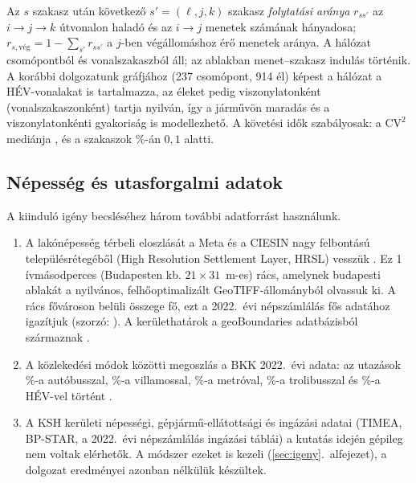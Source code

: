 \documentclass[12pt,a4paper]{article}
\theoremstyle{definition}
\theoremstyle{remark}
\begin{document}
Az $s$ szakasz után következő $s'=(\ell,j,k)$ szakasz \emph{folytatási aránya}
$r_{ss'}$ az $i\to j\to k$ útvonalon haladó és az $i\to j$ menetek számának
hányadosa; $r_{s,\text{vég}}=1-\sum_{s'}r_{ss'}$ a $j$-ben végállomáshoz
érő menetek aránya. A hálózat \NHUBS{} csomópontból és \NSEGS{}
vonalszakaszból áll; az ablakban \NTRIPSEG{} menet--szakasz indulás történik.
A korábbi dolgozatunk gráfjához (237 csomópont, 914 él) képest a
hálózat a HÉV-vonalakat is tartalmazza, az éleket pedig viszonylatonként
(vonalszakaszonként) tartja nyilván, így a járművön maradás és a
viszonylatonkénti gyakoriság is modellezhető. A követési idők szabályosak: a $\mathrm{CV}^2$ mediánja \MEDCVSQ, és a
szakaszok \SHARECVLOW{}\%-án $0{,}1$ alatti.

\subsection{Népesség és utasforgalmi adatok}
\label{sec:nepesseg}

A kiinduló igény becsléséhez három további adatforrást használunk.
\begin{enumerate}[label=(\roman*)]
  \item A lakónépesség térbeli eloszlását a Meta és a CIESIN nagy
    felbontású településrétegéből (High Resolution Settlement Layer, HRSL)
    vesszük \citep{tiecke2017}. Ez 1 ívmásodperces (Budapesten kb.
    $21\times31$~m-es) rács, amelynek budapesti ablakát a nyilvános,
    felhőoptimalizált GeoTIFF-állományból olvassuk ki. A rács fővároson belüli
    összege \POPHRSL{} fő, ezt a 2022.~évi népszámlálás \POPCITY{} fős
    adatához \citep{ksh2023} igazítjuk (szorzó: \POPSCALE). A kerülethatárok
    a geoBoundaries adatbázisból származnak \citep{runfola2020}.
  \item A közlekedési módok közötti megoszlás a BKK 2022.~évi adata: az
    utazások \TGTBUS\%-a autóbusszal, \TGTTRAM\%-a villamossal,
    \TGTMETRO\%-a metróval, \TGTTROLLEY\%-a trolibusszal és \TGTHEV\%-a
    HÉV-vel történt \citep{bkkmodal}.
  \item A KSH kerületi népességi, gépjármű-ellátottsági és ingázási adatai
    (TIMEA, BP-STAR, a 2022.~évi népszámlálás ingázási táblái) a kutatás
    idején gépileg nem voltak elérhetők. A módszer ezeket is kezeli
    (\ref{sec:igeny}.~alfejezet), a dolgozat eredményei azonban nélkülük
    készültek.
\end{enumerate}

\end{document}
